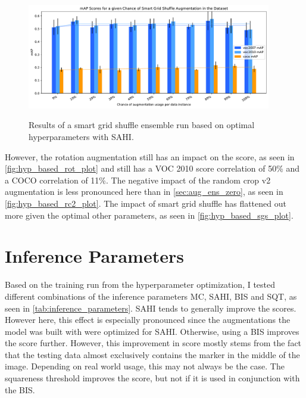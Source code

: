 \documentclass[10pt]{book}
\newcommand{\figureref}[1]{\autoref{#1}}
\begin{document}
\begin{figure}
  \caption{Results of a smart grid shuffle ensemble run based on optimal hyperparameters with \ac{SAHI}.}
  \includegraphics[width=0.95\textwidth]{image/hyp-based-sgs-sahi-ensemble-2-thesis-2}
  \label{fig:hyp_based_sgs_plot}
\end{figure}

However, the rotation augmentation still has an impact on the score, as seen in \figureref{fig:hyp_based_rot_plot} and still has a VOC 2010 score correlation of 50\% and a \ac{COCO} correlation of 11\%. The negative impact of the random crop v2 augmentation is less pronounced here than in \autoref{sec:aug_ens_zero}, as seen in \figureref{fig:hyp_based_rc2_plot}. The impact of smart grid shuffle has flattened out more given the optimal other parameters, as seen in \figureref{fig:hyp_based_sgs_plot}.

\section{Inference Parameters}
\label{sec:inference_params}

Based on the training run from the hyperparameter optimization, I tested different combinations of the inference parameters \ac{MC}, \ac{SAHI}, \ac{BIS} and \ac{SQT}, as seen in \autoref{tab:inference_parameters}. \ac{SAHI} tends to generally improve the scores. However here, this effect is especially pronounced since the augmentations the model was built with were optimized for \ac{SAHI}. Otherwise, using a \ac{BIS} improves the score further. However, this improvement in score mostly stems from the fact that the testing data almost exclusively contains the marker in the middle of the image. Depending on real world usage, this may not always be the case. The squareness threshold improves the score, but not if it is used in conjunction with the \ac{BIS}. 
\end{document}
